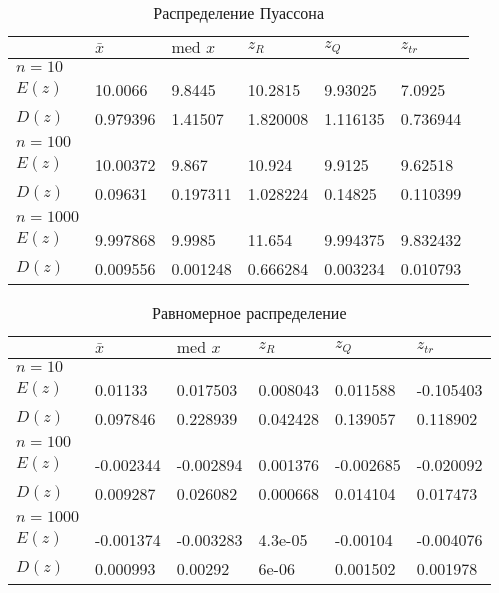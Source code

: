 \documentclass[12pt,a4paper]{article}
\begin{document}
\pagebreak

\begin{table}[h!]
	\centering
	\begin{tabular}{|l|l|l|l|l|l|}
		\hline&$\bar x$ &$\text{med }x$  &$z_R$  &$z_Q$  &$z_{tr}$  \\ \hline
		$n=10$&&&&& \\ \hline$E(z)$&10.0066&9.8445&10.2815&9.93025&7.0925 \\ \hline$D(z)$&0.979396&1.41507&1.820008&1.116135&0.736944 \\ \hline
		
		$n=100$&&&&& \\ \hline$E(z)$&10.00372&9.867&10.924&9.9125&9.62518 \\ \hline$D(z)$&0.09631&0.197311&1.028224&0.14825&0.110399 \\ \hline
		
		$n=1000$&&&&& \\ \hline$E(z)$&9.997868&9.9985&11.654&9.994375&9.832432 \\ \hline$D(z)$&0.009556&0.001248&0.666284&0.003234&0.010793 \\ \hline
	\end{tabular}
	\caption{Распределение Пуассона}
\end{table}

\begin{table}[h!]
	\centering
	\begin{tabular}{|l|l|l|l|l|l|}
		\hline&$\bar x$ &$\text{med }x$  &$z_R$  &$z_Q$  &$z_{tr}$  \\ \hline
		$n=10$&&&&& \\ \hline$E(z)$&0.01133&0.017503&0.008043&0.011588&-0.105403 \\ \hline$D(z)$&0.097846&0.228939&0.042428&0.139057&0.118902 \\ \hline
		
		$n=100$&&&&& \\ \hline$E(z)$&-0.002344&-0.002894&0.001376&-0.002685&-0.020092 \\ \hline$D(z)$&0.009287&0.026082&0.000668&0.014104&0.017473 \\ \hline
		
		$n=1000$&&&&& \\ \hline$E(z)$&-0.001374&-0.003283&4.3e-05&-0.00104&-0.004076 \\ \hline$D(z)$&0.000993&0.00292&6e-06&0.001502&0.001978 \\ \hline
	\end{tabular}
	\caption{Равномерное распределение}
\end{table}
\end{document}
